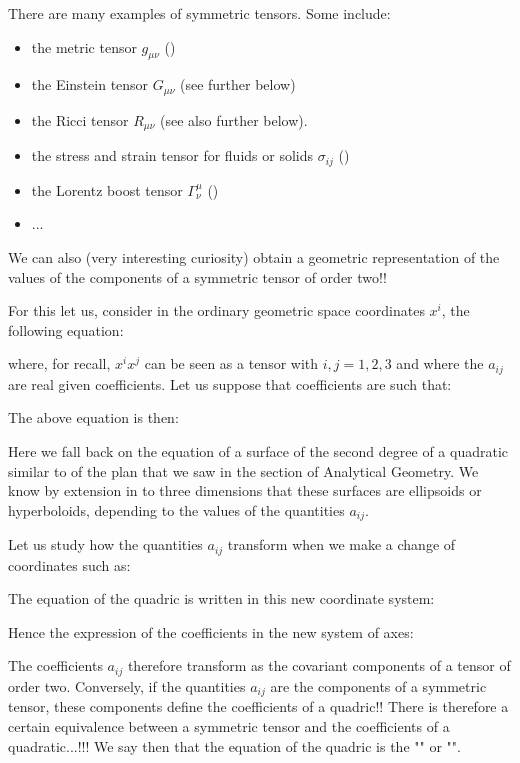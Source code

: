 	There are many examples of symmetric tensors. Some include:
	\begin{itemize}
		\item the metric tensor $g_{\mu \nu }$ () 
		\item the Einstein tensor $G_{\mu \nu }$ (see further below) 
		\item the Ricci tensor $R_{\mu \nu }$ (see also further below).
		\item the stress and strain tensor for fluids or solids  $\sigma_{ij}$ ()
		\item  the Lorentz boost tensor $\Gamma_\nu^\mu$ () 
		\item ...
	\end{itemize}
	We can also (very interesting curiosity) obtain a geometric representation of the values of the components of a symmetric tensor of order two!! 
	
	For this let us, consider in the ordinary geometric  space coordinates $x^i$, the following equation:
	
	where, for recall, $x^ix^j$ can be seen as a tensor with $i,j=1,2,3$ and where the $a_{ij}$ are real given coefficients. Let us suppose that coefficients are such that:
	
	The above equation is then:
	
	Here we fall back on the equation of a surface of the second degree of a quadratic similar to of the plan that we saw in the section of Analytical Geometry. We know by extension in to three dimensions that these surfaces are ellipsoids or hyperboloids, depending to the values of the quantities $a_{ij}$.
	
	Let us study how the quantities $a_{ij}$ transform  when we make a change of coordinates such as:
	
	The equation of the quadric is written in this new coordinate system:
	
	Hence the expression of the coefficients in the new system of axes:
	
	The coefficients $a_{ij}$ therefore transform as the covariant components of a tensor of order two. Conversely, if the quantities $a_{ij}$ are the components of a symmetric tensor, these components define the coefficients of a quadric!! There is therefore a certain equivalence between a symmetric tensor and the coefficients of a quadratic...!!! We say then that the equation of the quadric is the "" or "".
	
